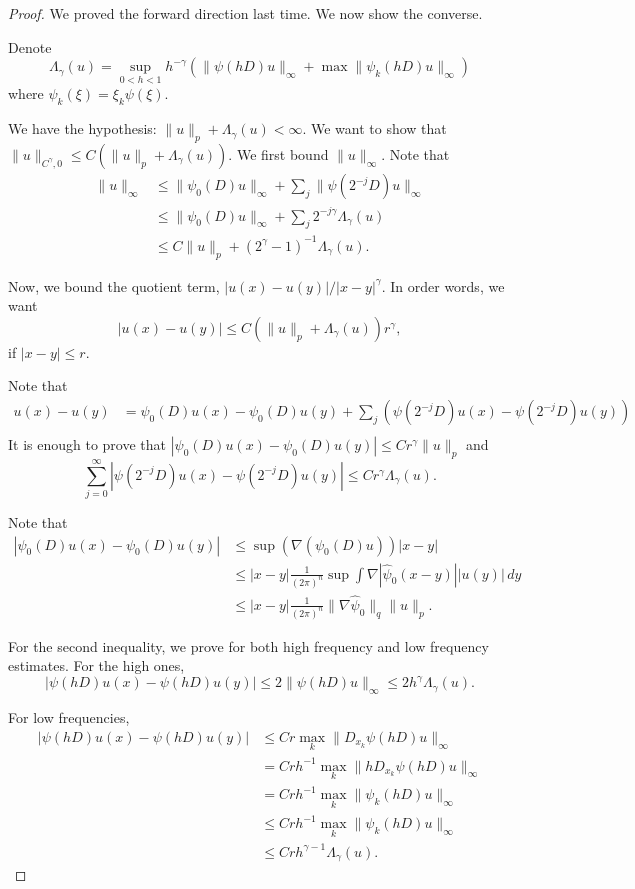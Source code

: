 \documentclass[12pt]{scrartcl}
\renewcommand{\hat}{\widehat}
\newcommand{\<}{\langle}
\renewcommand{\>}{\rangle}
\let \grad \nabla
\begin{document}
\begin{proof}
We proved the forward direction last time.  We now show the converse.  

Denote
$$\Lambda_\gamma(u) = \sup_{0 < h < 1} h^{-\gamma}(\| \psi(hD)u\|_\infty + \max \| \psi_k(hD)u\|_\infty)$$
where $\psi_k(\xi) = \xi_k \psi(\xi)$.  

We have the hypothesis: $\|u\|_p + \Lambda_\gamma(u) < \infty$.  We want to show that $\|u\|_{C^\gamma, 0} \le C(\|u\|_p + \Lambda_\gamma(u))$.  We first bound $\|u\|_\infty$.  Note that 
\begin{align*}
\|u\|_\infty &\le \|\psi_0(D)u\|_\infty + \sum_j \|\psi(2^{-j} D)u \|_\infty \\
&\le \|\psi_0(D)u\|_\infty + \sum_j 2^{-j\gamma} \Lambda_\gamma(u) \\
&\le C \|u\|_p + (2^\gamma - 1)^{-1} \Lambda_\gamma(u).
\end{align*}

Now, we bound the quotient term, $|u(x) - u(y)|/|x - y|^\gamma$.  In order words, we want
$$|u(x) - u(y)| \le C(\|u\|_p + \Lambda_\gamma(u))r^{\gamma},$$
if $|x - y| \le r$.

Note that \begin{align*}
u(x) - u(y) &= \psi_0(D) u(x) - \psi_0(D) u(y) + \sum_{j} \left (\psi(2^{-j}D) u(x) - \psi(2^{-j}D) u(y)\right ) \\
\end{align*}
It is enough to prove that $|\psi_0(D)u(x) - \psi_0(D) u(y)| \le Cr^{\gamma} \|u\|_p$ and 
$$\sum_{j=0}^\infty |\psi(2^{-j}D)u(x) - \psi(2^{-j}D)u(y)| \le Cr^{\gamma} \Lambda_\gamma(u).$$

Note that 
\begin{align*}
|\psi_0(D) u(x) - \psi_0(D)u(y) | &\le \sup(\grad(\psi_0(D)u))|x-y|  \\
&\le |x - y| \frac{1}{(2\pi)^{n}} \sup \int \grad |\hat{\psi}_0(x-y) ||u(y)|\,dy \\
&\le |x - y| \frac{1}{(2\pi)^n} \| \grad \hat{\psi}_0\|_q \|u\|_p.
\end{align*}

For the second inequality, we prove for both high frequency and low frequency estimates.  For the high ones,
$$|\psi(hD)u(x) -\psi(hD)u(y)| \le 2 \|\psi(hD)u\|_\infty \le 2 h^\gamma \Lambda_\gamma (u).$$

For low frequencies, 
\begin{align*}
|\psi(hD)u(x) - \psi(hD) u(y)|&\le Cr \max_k \|D_{x_k} \psi(hD) u\|_\infty \\
&= Cr h^{-1} \max_k \| hD_{x_k} \psi(hD)u\|_\infty \\
&= Crh^{-1}\max_k \|\psi_k(h D) u\|_\infty \\
&\le  Crh^{-1} \max_k \| \psi_k(hD)u\|_\infty \\
&\le Crh^{\gamma - 1} \Lambda_\gamma(u).
\end{align*}


\end{proof}
\end{document}
